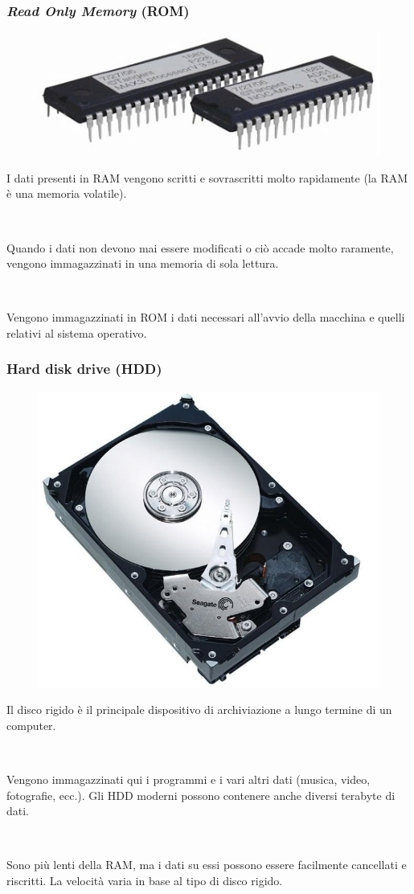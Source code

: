 \documentclass[handout]{beamer}
\begin{document}
\begin{frame}
\frametitle{\emph{Read Only Memory} (ROM)}
\begin{figure}
  \includegraphics[width=.5\columnwidth]{img/rom.png}
\end{figure}
I dati presenti in RAM vengono scritti e sovrascritti molto rapidamente (la RAM è una \alert<1>{memoria volatile}).\pause

~

Quando i dati non devono mai essere modificati o ciò accade molto raramente, vengono immagazzinati in una \alert<2>{memoria di sola lettura}.\pause

~

Vengono immagazzinati in ROM i dati necessari all'avvio della macchina e quelli relativi al \alert<3>{sistema operativo}.
\end{frame}


\begin{frame}
\frametitle{Hard disk drive (HDD)}
\begin{figure}
  \includegraphics[width=.3\columnwidth]{img/hdd.png}
\end{figure}
Il disco rigido è il principale \alert<1>{dispositivo di archiviazione} a lungo termine di un computer.\pause

~

Vengono immagazzinati qui i programmi e i vari altri dati (musica, video, fotografie, ecc.). Gli HDD moderni possono contenere anche diversi terabyte di dati. \pause

~

Sono più lenti della RAM, ma i dati su essi possono essere facilmente cancellati e riscritti. La velocità varia in base al tipo di disco rigido.
\end{frame}
\end{document}
